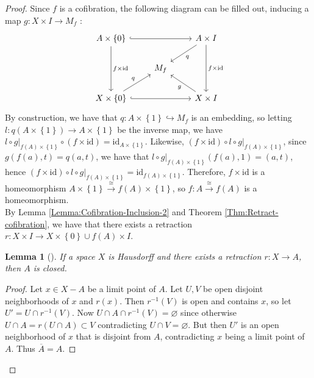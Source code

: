 \documentclass[reqno]{amsart}
\newtheorem{lemma}[theorem]{Lemma}
\theoremstyle{definition}
\theoremstyle{remark}
\newcommand{\id}{{\mathrm{id}}}
\begin{document}
\begin{proof}
    Since $f$ is a cofibration, the following diagram
    can be filled out, inducing a map
    $g \colon X \times I \to M_f$ :
    \begin{equation*}
    \begin{tikzcd}
        A \times \left\{ 0 \right\} \ar[dd, "f \times \id"] 
        \ar[rr, hookrightarrow] & & A \times I \ar[dd, "f \times 
        \id"] \ar[dl, "q"] \\
                                & M_f & \\
        X \times \left\{ 0 \right\} \ar[ur, "q"] 
        \ar[rr, hookrightarrow]& & X \times I 
        \ar[ul, "g"]
    \end{tikzcd}
    \end{equation*}
    By construction, we have that
    $q \colon A \times \left\{ 1 \right\} 
    \hookrightarrow M_f$ is an embedding, so
    letting $l \colon
    q \left( A \times \left\{ 1 \right\}  \right) 
    \to A \times \left\{ 1 \right\} $ be the inverse map,
    we have
    $l \circ g|_{f(A) \times \left\{ 1 \right\} } 
    \circ \left( f \times \id \right) 
    = \id_{A \times \left\{ 1 \right\} }$.
    Likewise,
    $\left( f \times \id \right) 
    \circ l \circ g|_{f(A) \times \left\{ 1 \right\} }$,
    since $g \left( f(a), t \right) 
    = q(a,t)$, we have that
    $l \circ g|_{f(A) \times \left\{ 1 \right\} }
    (f(a),1) = (a,t)$, hence
    $\left( f \times \id \right) 
    \circ l \circ g|_{f(A) \times \left\{ 1 \right\} }
    = \id_{f(A) \times \left\{ 1 \right\} }$.
    Therefore,
    $f \times \id$ is a homeomorphism
    $A \times \left\{ 1 \right\}  \stackrel{\cong}{\to} 
    f(A) \times \left\{ 1 \right\} $, so
    $f \colon A \stackrel{\cong}{\to} f(A)$ is a homeomorphism.\\
    \linebreak
    By Lemma \ref{Lemma:Cofibration-Inclusion-2} and
    Theorem \ref{Thm:Retract-cofibration}, we
    have that there exists a retraction
    $r \colon X \times I \to 
    X \times \left\{ 0 \right\} \cup 
    f(A) \times I$.

    \begin{lemma}[]
         If a space $X$ is Hausdorff and
          there exists a retraction
          $r \colon X \to A$, then $A$ is closed.
    \end{lemma}

    \begin{proof}
        Let
        $x \in X -A$ be a limit point of $A$. Let
        $U ,V$ be open disjoint neighborhoods of
        $x$ and $r(x)$. Then
        $r^{-1}(V)$ is open and contains $x$, so
        let $U' = U \cap r^{-1}(V)$.
        Now $U \cap A \cap r^{-1}(V) = \varnothing$ since
        otherwise $U \cap A = r\left( U \cap A \right) 
        \subset V$ contradicting $U \cap V = \varnothing$.
        But then $U'$ is an open neighborhood of $x$
        that is disjoint from $A$, contradicting $x$ being
        a limit point of $A$.
        Thus $\overline{A} = A$.
    \end{proof}


\end{proof}
\end{document}
